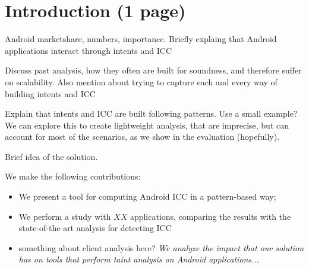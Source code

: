 \section{Introduction (1 page)}

Android marketshare, numbers, importance. 
Briefly explaing that Android applications interact through intents and ICC

Discuss past analysis, how they often are built for soundness, and therefore suffer on scalability. Also mention about trying to capture each and every way of building intents and ICC

Explain that intents and ICC are built following patterns. Use a small example? We can explore this to create lightweight analysis, that are imprecise, but can account for most of the scenarios, as we show in the evaluation (hopefully). 

Brief idea of the solution. 

We make the following contributions:
\begin{itemize}
 \item We present a tool for computing Android ICC in a pattern-based way;
 \item We perform a study with $XX$ applications, comparing the results with the state-of-the-art analysis for detecting ICC~\cite{epicc,iccta,comdroid}
 \item something about client analysis here? \emph{We analyze the impact that our solution has on tools that perform taint analysis on Android applications...}
\end{itemize}


